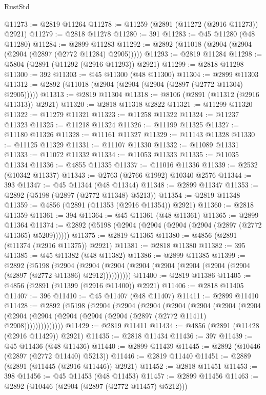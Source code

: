\begin{lexlean}{RustStd}
\begin{coremodule}
@11273 := @2819 @11264
@11278 := @11259 (@2891 (@11272 (@2916 @11273)) @2921)
@11279 := @2818 @11278
@11280 := 391
@11283 := @45 @11280 (@48 @11280)
@11284 := @2899 @11283
@11292 := @2892 (@11018 (@2904 (@2904 (@2904 (@2897 (@2772 @11284) @2905)))))
@11293 := @2819 @11284
@11298 := @5804 (@2891 (@11292 (@2916 @11293)) @2921)
@11299 := @2818 @11298
@11300 := 392
@11303 := @45 @11300 (@48 @11300)
@11304 := @2899 @11303
@11312 := @2892 (@11018 (@2904 (@2904 (@2904 (@2897 (@2772 @11304) @2905)))))
@11313 := @2819 @11304
@11318 := @8106 (@2891 (@11312 (@2916 @11313)) @2921)
@11320 := @2818 @11318 @2822
@11321 := @11299 @11320
@11322 := @11279 @11321
@11323 := @11258 @11322
@11324 := @11237 @11323
@11325 := @11218 @11324
@11326 := @11199 @11325
@11327 := @11180 @11326
@11328 := @11161 @11327
@11329 := @11143 @11328
@11330 := @11125 @11329
@11331 := @11107 @11330
@11332 := @11089 @11331
@11333 := @11072 @11332
@11334 := @11053 @11333
@11335 := @11035 @11334
@11336 := @4855 @11335
@11337 := @11016 @11336
@11339 := @2532 (@10342 @11337)
@11343 := @2763 (@2766 @1992) @10340 @2576
@11344 := 393
@11347 := @45 @11344 (@48 @11344)
@11348 := @2899 @11347
@11353 := @2892 (@5198 (@2897 (@2772 @11348) @5213))
@11354 := @2819 @11348
@11359 := @4856 (@2891 (@11353 (@2916 @11354)) @2921)
@11360 := @2818 @11359
@11361 := 394
@11364 := @45 @11361 (@48 @11361)
@11365 := @2899 @11364
@11374 := @2892 (@5198 (@2904 (@2904 (@2904 (@2904 (@2897 (@2772 @11365) @5209))))))
@11375 := @2819 @11365
@11380 := @4856 (@2891 (@11374 (@2916 @11375)) @2921)
@11381 := @2818 @11380
@11382 := 395
@11385 := @45 @11382 (@48 @11382)
@11386 := @2899 @11385
@11399 := @2892
    (@5198
      (@2904 (@2904 (@2904 (@2904 (@2904 (@2904 (@2904 (@2904 (@2897 (@2772 @11386) @2912))))))))))
@11400 := @2819 @11386
@11405 := @4856 (@2891 (@11399 (@2916 @11400)) @2921)
@11406 := @2818 @11405
@11407 := 396
@11410 := @45 @11407 (@48 @11407)
@11411 := @2899 @11410
@11428 := @2892
    (@5198
      (@2904
        (@2904
          (@2904
            (@2904
              (@2904
                (@2904
                  (@2904
                    (@2904 (@2904 (@2904 (@2904 (@2904 (@2897 (@2772 @11411) @2908))))))))))))))
@11429 := @2819 @11411
@11434 := @4856 (@2891 (@11428 (@2916 @11429)) @2921)
@11435 := @2818 @11434
@11436 := 397
@11439 := @45 @11436 (@48 @11436)
@11440 := @2899 @11439
@11445 := @2892 (@10446 (@2897 (@2772 @11440) @5213))
@11446 := @2819 @11440
@11451 := @2889 (@2891 (@11445 (@2916 @11446)) @2921)
@11452 := @2818 @11451
@11453 := 398
@11456 := @45 @11453 (@48 @11453)
@11457 := @2899 @11456
@11463 := @2892 (@10446 (@2904 (@2897 (@2772 @11457) @5212)))

\end{coremodule}
\end{lexlean}
